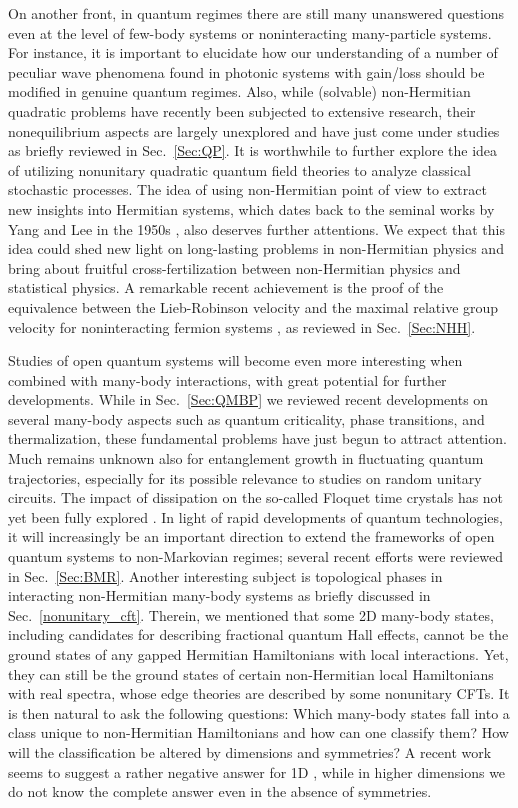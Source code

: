 \documentclass{tADP2e}
\theoremstyle{plain}
\theoremstyle{plain}
\theoremstyle{definition}
\begin{document}
On another front, in quantum regimes there are still many unanswered questions even at the level of few-body systems or noninteracting many-particle systems. For instance, it is important to elucidate how our understanding of a number of peculiar wave phenomena found in photonic systems with gain/loss should be modified in genuine quantum regimes. Also, while (solvable) non-Hermitian quadratic problems have recently been subjected to extensive research, their nonequilibrium aspects are largely unexplored and have just come under studies as briefly reviewed in Sec.~\ref{Sec:QP}. It is worthwhile to further explore the idea of utilizing nonunitary quadratic quantum field theories to analyze classical stochastic processes. The idea of using non-Hermitian point of view to extract new insights into Hermitian systems, which dates back to the seminal works by Yang and Lee in the 1950s \cite{LTD52}, also deserves further attentions. We expect that this idea could shed new light on long-lasting problems in non-Hermitian physics and bring about fruitful cross-fertilization between non-Hermitian physics and statistical physics. A remarkable recent achievement is the proof of the equivalence between the Lieb-Robinson velocity and the maximal relative group velocity for noninteracting fermion systems \cite{ZG2019}, as reviewed in Sec.~\ref{Sec:NHH}.

Studies of open quantum systems will become even more interesting when combined with many-body interactions, with great potential for further developments. While in Sec.~\ref{Sec:QMBP} we reviewed recent developments on several many-body aspects such as quantum criticality, phase transitions, and thermalization, these fundamental problems have just begun to attract attention. Much remains unknown also for entanglement growth in fluctuating quantum trajectories, especially for its possible relevance to studies on random unitary circuits. The impact of dissipation on the so-called Floquet time crystals \cite{KV16,EDV16} has not yet been fully explored \cite{GZHR18,GFM19,BZ19}. In light of rapid developments of quantum technologies, it will increasingly be an important direction to extend the frameworks of open quantum systems to non-Markovian regimes; several recent efforts were reviewed in Sec.~\ref{Sec:BMR}.
 Another interesting subject is topological phases in interacting non-Hermitian many-body systems as briefly discussed in Sec.~\ref{nonunitary_cft}. Therein, we mentioned that some 2D many-body states, including candidates for describing fractional quantum Hall effects, cannot be the ground states of any gapped Hermitian Hamiltonians with local interactions. Yet, they can still be the ground states of certain non-Hermitian local Hamiltonians with real spectra, whose edge theories are described by some nonunitary CFTs. It is then natural to ask the following questions: Which many-body states fall into a class unique to non-Hermitian Hamiltonians and how can one classify them? How will the classification be altered by dimensions and symmetries? A recent work seems to suggest a rather negative answer for 1D \cite{WX19}, while in higher dimensions we do not know the complete answer even in the absence of symmetries.
\end{document}
